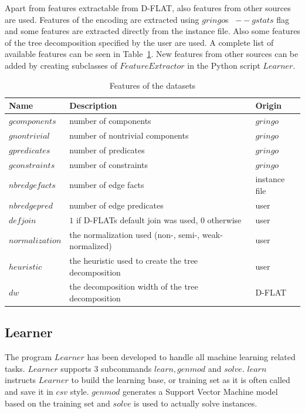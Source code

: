 Apart from features extractable from \mbox{D-FLAT}, also features from other sources are used. Features of the encoding are extracted using \inline$gringo$s~\cite{Gringo} \inline$--gstats$ flag and some features are extracted directly from the instance file. Also some features of the tree decomposition specified by the user are used. A complete list of available features can be seen in Table~\ref{tbl:feat}. New features from other sources can be added by creating subclasses of \inline$FeatureExtractor$ in the Python script  \inline$Learner$.

\begin{table}[h]
	\center
	\begin{tabular}{|l|l|l|}
		\hline
		Name & Description & Origin \\
		\hline
		\inline$gcomponents$ & number of components & \inline$gringo$\\
		\inline$gnontrivial$ & number of nontrivial components & \inline$gringo$\\
		\inline$gpredicates$ & number of predicates & \inline$gringo$ \\
		\inline$gconstraints$ & number of constraints & \inline$gringo$\\
		\inline$nbredgefacts$ & number of edge facts & instance file\\
		\inline$nbredgepred$ & number of edge predicates & user \\
		\inline$defjoin$ & $1$ if \mbox{D-FLAT}s default join was used, $0$ otherwise & user\\
		\inline$normalization$ & the normalization used (non-, semi-, weak-normalized) & user\\
		\inline$heuristic$ & the heuristic used to create the tree decomposition & user\\
		\inline$dw$ & the decomposition width of the tree decomposition & \mbox{D-FLAT}\\
		\hline
	\end{tabular}
	\caption{Features of the datasets}
	\label{tbl:feat}
\end{table}

\subsection{Learner}
The program \inline$Learner$ has been developed to handle all machine learning related tasks. \inline$Learner$ supports $3$ subcommands \inline$learn, genmod$ and \inline$solve$. 
\inline$learn$ instructs \inline$Learner$ to build the learning base, or training set as it is often called and save it in \inline$csv$ style. 
\inline$genmod$ generates a Support Vector Machine model based on the training set and \inline$solve$ is used to actually solve instances. %

